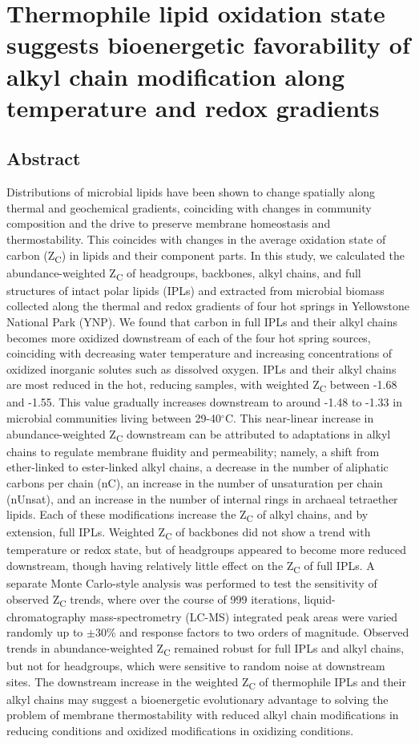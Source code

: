 \chapter{Thermophile lipid oxidation state suggests bioenergetic favorability of alkyl chain modification along temperature and redox gradients}\label{ch1}

\section{Abstract}
Distributions of microbial lipids have been shown to change spatially along thermal and geochemical gradients, coinciding with changes in community composition and the drive to preserve membrane homeostasis and thermostability. This coincides with changes in the average oxidation state of carbon (Z\textsubscript{C}) in lipids and their component parts. In this study, we calculated the abundance-weighted Z\textsubscript{C} of headgroups, backbones, alkyl chains, and full structures of intact polar lipids (IPLs) and extracted from microbial biomass collected along the thermal and redox gradients of four hot springs in Yellowstone National Park (YNP). We found that carbon in full IPLs and their alkyl chains becomes more oxidized downstream of each of the four hot spring sources, coinciding with decreasing water temperature and increasing concentrations of oxidized inorganic solutes such as dissolved oxygen. IPLs and their alkyl chains are most reduced in the hot, reducing samples, with weighted Z\textsubscript{C} between -1.68 and -1.55. This value gradually increases downstream to around -1.48 to -1.33 in microbial communities living between 29-40$^\circ$C. This near-linear increase in abundance-weighted Z\textsubscript{C} downstream can be attributed to adaptations in alkyl chains to regulate membrane fluidity and permeability; namely, a shift from ether-linked to ester-linked alkyl chains, a decrease in the number of aliphatic carbons per chain (nC), an increase in the number of unsaturation per chain (nUnsat), and an increase in the number of internal rings in archaeal tetraether lipids. Each of these modifications increase the Z\textsubscript{C} of alkyl chains, and by extension, full IPLs. Weighted Z\textsubscript{C} of backbones did not show a trend with temperature or redox state, but of headgroups appeared to become more reduced downstream, though having relatively little effect on the Z\textsubscript{C} of full IPLs. A separate Monte Carlo-style analysis was performed to test the sensitivity of observed Z\textsubscript{C} trends, where over the course of 999 iterations, liquid-chromatography mass-spectrometry (LC-MS) integrated peak areas were varied randomly up to $\pm$30\% and response factors to two orders of magnitude. Observed trends in abundance-weighted Z\textsubscript{C} remained robust for full IPLs and alkyl chains, but not for headgroups, which were sensitive to random noise at downstream sites. The downstream increase in the weighted Z\textsubscript{C} of thermophile IPLs and their alkyl chains may suggest a bioenergetic evolutionary advantage to solving the problem of membrane thermostability with reduced alkyl chain modifications in reducing conditions and oxidized modifications in oxidizing conditions.

